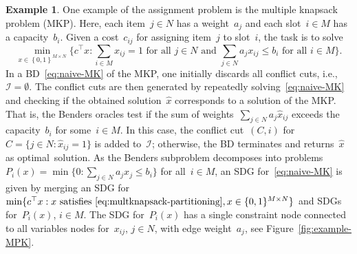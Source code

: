 \documentclass[a4paper,10pt]{article}
\newcommand{\B}[1]{\{0,1\}^{#1}}
\newcommand{\fixed}[1]{\hat{ #1 }}
\newcommand{\sprod}[2]{#1^\top #2}
\newcommand{\brackets}[1]{\left\{ #1 \right\}}
\theoremstyle{definition}
\newtheorem{example}[theorem]{Example}
\begin{document}
\begin{example}
  \label{example:multipleknapsack}
  One example of the assignment problem is the multiple knapsack problem (MKP).
  Here, each item~$j \in N$ has a weight~$a_j$ and each slot~$i \in M$ has a capacity~$b_i$.
  Given a cost~$c_{ij}$ for assigning item~$j$ to slot~$i$,
  the task is to solve
  \begin{equation*}
    \min_{x\in \brackets{0, 1}^{M\times N}}\Big\{\sprod{c}{x} : 
    \sum_{i\in M} x_{ij} = 1 \text{ for all } j \in N \text{ and }
    \sum_{j\in N} a_j x_{ij} \leq b_i \text{ for all } i \in M\Big\}.
  \end{equation*}
  In a BD~\eqref{eq:naive-MK} of the MKP, one initially discards all conflict cuts, i.e., $\mathcal{I} = \emptyset$.
  The conflict cuts are then generated by repeatedly solving~\eqref{eq:naive-MK} and checking if the obtained solution~$\fixed{x}$ corresponds to a solution of the MKP.
  That is, the Benders oracles test if the sum of weights~$\sum_{j\in N}a_j\fixed{x}_{ij}$ exceeds the capacity~$b_i$ for some~${i \in M}$.
  In this case, the conflict cut~$(C,i)$ for~$C = \{j \in N: \fixed{x}_{ij} = 1\}$ is added to~$\mathcal{I}$; otherwise, the BD terminates and returns~$\fixed{x}$ as optimal~solution.
  As the Benders subproblem decomposes into problems~$P_i(x) = \min\{0 : \sum_{j \in N} a_j x_j \leq b_i\}$ for all~$i \in M$, an SDG for~\eqref{eq:naive-MK} is given by merging an SDG for~$\min\{\sprod{c}{x} : x \text{ satisfies~\eqref{eq:multknapsack-partitioning}}, x \in \B{M\times N}\}$ and SDGs for~$P_i(x)$, $i \in M$.
  The SDG for~$P_i(x)$ has a single constraint node connected to all variables nodes for~$x_{ij}$, $j \in N$, with edge weight~$a_j$, see Figure~\ref{fig:example-MPK}.
\end{example}
\end{document}
